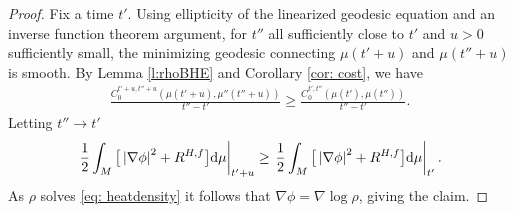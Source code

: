 \documentclass[10pt,a4paper]{article}
\numberwithin{equation}{section}
\newcommand{\brs}[1]{\left| #1 \right|}
\newcommand{\N}{\nabla}
\begin{document}
\begin{proof}
 Fix a time $t'$. Using ellipticity of the linearized geodesic equation and an inverse function theorem argument, for $t''$ all sufficiently close to $t'$ and $u > 0$ sufficiently small, the minimizing geodesic connecting $\mu(t' + u)$ and $\mu(t'' + u)$ is smooth. By Lemma \ref{l:rhoBHE} and Corollary \ref{cor: cost}, we have
 \begin{align*}
 \frac{C_0^{t'+u,t''+u}(\mu(t'+u),\mu''(t''+u))}{t''-t'}\geq \frac{C_0^{t',t''}(\mu(t'),\mu(t''))}{t''-t'}.
 \end{align*}
 Letting $t''\to t'$
 \begin{align*}
 \left. \frac12\int_M\big[\brs{\N\phi}^2+R^{H,f}\big] {\rm d}\mu\right|_{t'+u}\geq
 \left. \frac12\int_M\big[\brs{\N\phi}^2+R^{H,f}\big] {\rm d}\mu\right|_{t'}.
 \end{align*}
 As $\rho$ solves \eqref{eq: heatdensity} it follows that $\N \phi= \N \log \rho$, giving the claim.
\end{proof}
\end{document}
